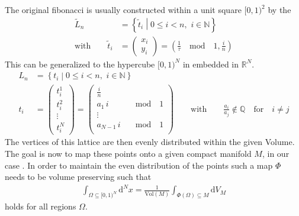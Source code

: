 The original fibonacci is usually constructed within a unit square $[0,1)^2$ by the
\begin{align*}
 \tilde{L}_n                      & = \left\{ \tilde{t}_i \middle| 0 \le i < n, \, \, i \in \mathbb{N} \right\}                         \\
 \textrm{with} \qquad \tilde{t}_i & = \begin{pmatrix}x_i\\y_i\end{pmatrix} = \left(\frac{1}{\tau} \quad \textrm{mod} \quad 1, \frac{i}{n} \right)
\end{align*}
\noindent This can be generalized to the hypercube $[0,1)^N$ in embedded in $\mathbb{R}^N$.
\begin{align*}
 L_n & = \left\{ t_i \middle| 0 \le i < n, \, \, i \in \mathbb{N} \right\}                                                                                       \\
 t_i & = \begin{pmatrix} t_i^1 \\ t_i^2 \\ \vdots \\ t_i^N \end{pmatrix} = \begin{pmatrix}
  \frac{i}{n}        &                      \\
  a_1 \, i \quad     & \textrm{mod} \quad 1 \\
  \vdots             &                      \\
  a_{N-1} \, i \quad & \textrm{mod} \quad 1 \\
 \end{pmatrix} \qquad \textrm{with} \qquad \frac{a_i}{a_j} \notin \mathbb{Q} \quad \textrm{for} \quad i \neq j
\end{align*}
The vertices of this lattice are then evenly distributed within the given Volume. The goal is now to map these points onto a given compact manifold $M$, in our case \SUTwo. In order to maintain the even distribution of the points such a map $\Phi$ needs to be volume preserving such that
\begin{align}
 \int_{\Omega \subseteq [0,1)^N} \mathrm{d}^N x = \frac{1}{\mathrm{Vol}(M)} \int_{\Phi(\Omega) \subseteq M} \mathrm{d}V_M
 \label{eq:fibAreaPres}
\end{align}
holds for all regions $\Omega$.


